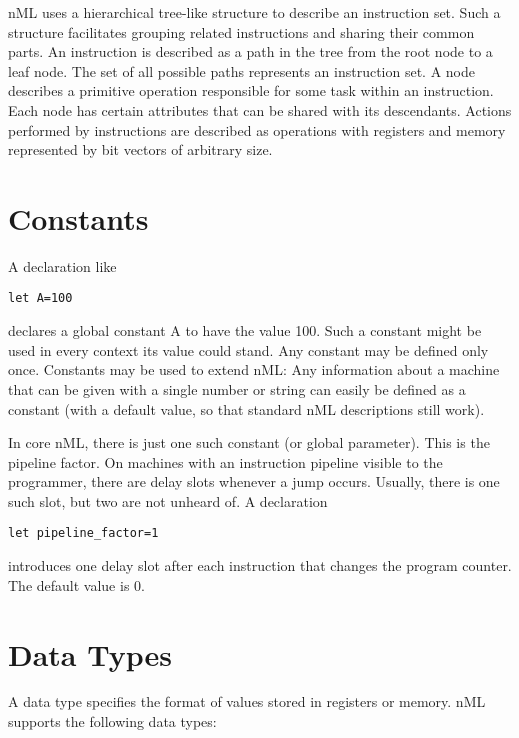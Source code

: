 \documentclass[oneside,final,14pt]{extreport}
\begin{document}
nML uses a hierarchical tree-like structure to describe an instruction set.
Such a structure facilitates grouping related instructions and sharing their
common parts. An instruction is described as a path in the tree from the root
node to a leaf node. The set of all possible paths represents an instruction
set. A node describes a primitive operation responsible for some task within
an instruction. Each node has certain attributes that can be shared with its
descendants. Actions performed by instructions are described as operations
with registers and memory represented by bit vectors of arbitrary size.

\section{Constants}

A declaration like

\begin{lstlisting}
let A=100
\end{lstlisting}

declares a global constant A to have the value 100. Such a constant might be used in every context
its value could stand. Any constant may be defined only once. Constants may be used to extend nML:
Any information about a machine that can be given with a single number or string can easily be
defined as a constant (with a default value, so that standard nML descriptions still work).

In core nML, there is just one such constant (or global parameter).
This is the pipeline factor. On machines with an instruction pipeline visible to the programmer,
there are delay slots whenever a jump occurs. Usually, there is one such slot, but two are not
unheard of. A declaration

\begin{lstlisting}
let pipeline_factor=1
\end{lstlisting}

introduces one delay slot after each instruction that changes the program counter. The default
value is 0.

\section{Data Types}

A data type specifies the format of values stored in registers or memory. nML supports
the following data types: 
\end{document}
